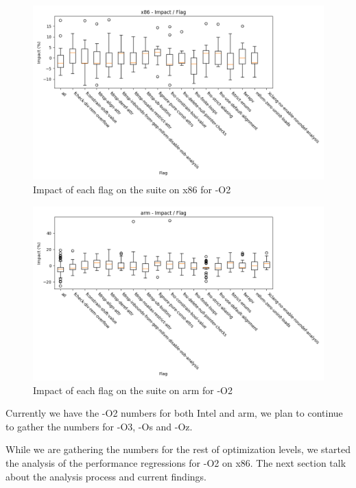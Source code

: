 \begin{figure}[H]
  \centering
  \includegraphics[scale=0.6]{x86_impact_per_flag}
  \caption{Impact of each flag on the suite on x86 for -O2}
  \label{fig:x86_impact_per_flag}
\end{figure}

\begin{figure}[H]
  \centering
  \includegraphics[scale=0.6]{arm_impact_per_flag}
  \caption{Impact of each flag on the suite on arm for -O2}
  \label{fig:arm_impact_per_flag}
\end{figure}

Currently we have the -O2 numbers for both Intel and arm, we plan to continue to
gather the numbers for -O3, -Os and -Oz.

While we are gathering the numbers for the rest of optimization levels, we
started the analysis of the performance regressions for -O2 on x86. The next
section talk about the analysis process and current findings.
